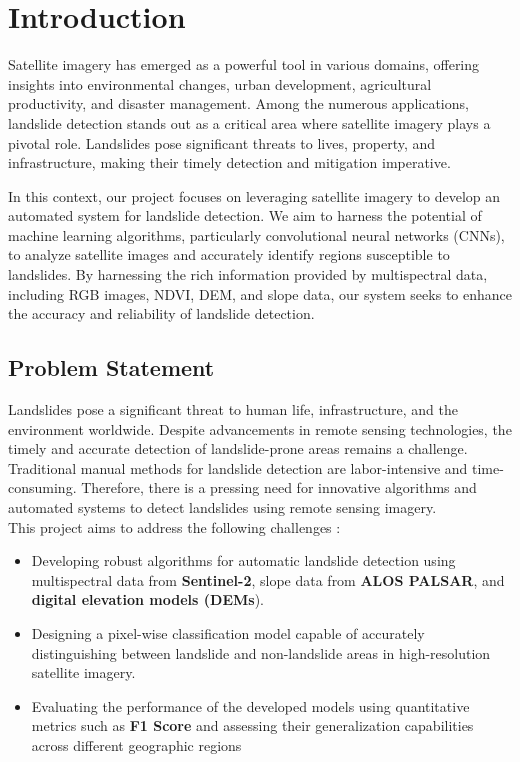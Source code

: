 \documentclass[12pt,a4paper]{report}
\begin{document}
	\section{Introduction}
		{Satellite imagery has emerged as a powerful tool in various domains, offering insights into environmental changes, urban development, agricultural productivity, and disaster management. Among the numerous applications, landslide detection stands out as a critical area where satellite imagery plays a pivotal role. Landslides pose significant threats to lives, property, and infrastructure, making their timely detection and mitigation imperative.

In this context, our project focuses on leveraging satellite imagery to develop an automated system for landslide detection. We aim to harness the potential of machine learning algorithms, particularly convolutional neural networks (CNNs), to analyze satellite images and accurately identify regions susceptible to landslides. By harnessing the rich information provided by multispectral data, including RGB images, NDVI, DEM, and slope data, our system seeks to enhance the accuracy and reliability of landslide detection. }
	\label{Problem Statement}
	\subsection{Problem Statement }
	Landslides pose a significant threat to human life, infrastructure, and the environment worldwide. Despite advancements in remote sensing technologies, the timely and accurate detection of landslide-prone areas remains a challenge. Traditional manual methods for landslide detection are labor-intensive and time-consuming. Therefore, there is a pressing need for innovative algorithms and automated systems to detect landslides using remote sensing imagery. \\
	
	This project aims to address the following challenges : 
\begin{itemize}
    \item Developing robust algorithms for automatic landslide detection using multispectral data from \textbf{Sentinel-2}, slope data from \textbf{ALOS PALSAR}, and \textbf{digital elevation models (DEMs}).
    \item Designing a pixel-wise classification model capable of accurately distinguishing between landslide and non-landslide areas in high-resolution satellite imagery. 
    \item Evaluating the performance of the developed models using quantitative metrics such as \textbf{F1 Score} and assessing their generalization capabilities across different geographic regions
\end{itemize}
	\label{Objective}
\end{document}
